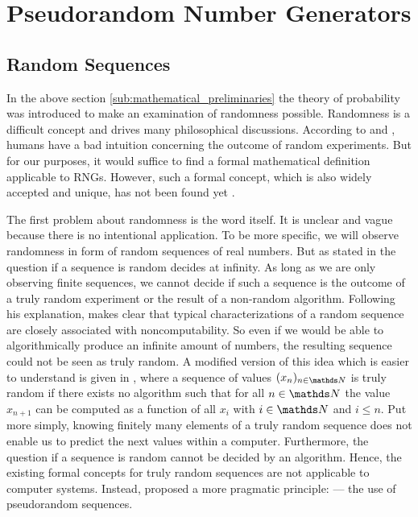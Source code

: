 \documentclass{stdlocal}
\begin{document}
\section{Pseudorandom Number Generators} %
\label{sub:pseudorandom_number_generators}
  \subsection{Random Sequences}
  In the above section \ref{sub:mathematical_preliminaries} the theory of probability was introduced to make an examination of randomness possible.
  Randomness is a difficult concept and drives many philosophical discussions.
  According to \textcite{volchan2002} and \textcite[\ppno~10-11]{kneusel2018}, humans have a bad intuition concerning the outcome of random experiments.
  But for our purposes, it would suffice to find a formal mathematical definition applicable to RNGs.
  However, such a formal concept, which is also widely accepted and unique, has not been found yet \autocite{volchan2002}.

  The first problem about randomness is the word itself.
  It is unclear and vague because there is no intentional application.
  To be more specific, we will observe randomness in form of random sequences of real numbers.
  But as stated in \textcite{volchan2002} the question if a sequence is random decides at infinity.
  As long as we are only observing finite sequences, we cannot decide if such a sequence is the outcome of a truly random experiment or the result of a non-random algorithm.
  Following his explanation, \citeauthor{volchan2002} makes clear that typical characterizations of a random sequence are closely associated with noncomputability.
  So even if we would be able to algorithmically produce an infinite amount of numbers, the resulting sequence could not be seen as truly random.
  A modified version of this idea which is easier to understand is given in \textcite{kneusel2018}, where a sequence of values $(x_n)_{n\in\setNatural}$ is truly random if there exists no algorithm such that for all $n\in\setNatural$ the value $x_{n+1}$ can be computed as a function of all $x_i$ with $i\in\setNatural$ and $i\leq n$.
  Put more simply, knowing finitely many elements of a truly random sequence does not enable us to predict the next values within a computer.
  Furthermore, the question if a sequence is random cannot be decided by an algorithm.
  Hence, the existing formal concepts for truly random sequences are not applicable to computer systems.
  Instead, \citeauthor{volchan2002} proposed a more pragmatic principle:  --- the use of pseudorandom sequences.
\end{document}
